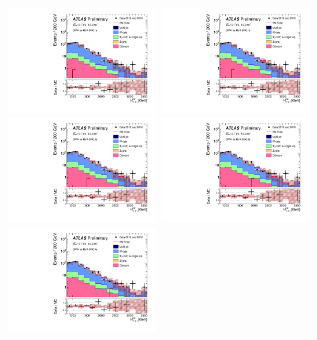 \clearpage
\begin{figure}[tbph]
\begin{center}
\includegraphics[width=0.35\textwidth]{figures/ATLAS-CONF-2016-078_INT/N-1Plots/AtlasStyle/Preliminary/CRW_SRJigsawSRG1a_LastCut_CRW_minusone}
\includegraphics[width=0.35\textwidth]{figures/ATLAS-CONF-2016-078_INT/N-1Plots/AtlasStyle/Preliminary/CRW_SRJigsawSRG1b_LastCut_CRW_minusone}
\includegraphics[width=0.35\textwidth]{figures/ATLAS-CONF-2016-078_INT/N-1Plots/AtlasStyle/Preliminary/CRW_SRJigsawSRG2a_LastCut_CRW_minusone}
\includegraphics[width=0.35\textwidth]{figures/ATLAS-CONF-2016-078_INT/N-1Plots/AtlasStyle/Preliminary/CRW_SRJigsawSRG2b_LastCut_CRW_minusone}
\includegraphics[width=0.35\textwidth]{figures/ATLAS-CONF-2016-078_INT/N-1Plots/AtlasStyle/Preliminary/CRW_SRJigsawSRG3a_LastCut_CRW_minusone}

\end{center}
\end{figure}
